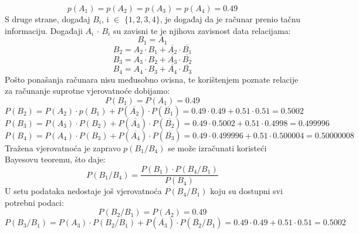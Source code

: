 \documentclass[12pt]{article}
\begin{document}
\begin{enumerate}
\begin{equation*}
    p(A_1) = p(A_2) = p(A_3) = p(A_4) = 0.49
\end{equation*}
S druge strane, događaj $B_i$, i ${\in}$ $\{1, 2, 3, 4\}$, je događaj da je računar prenio tačnu informaciju. 
Događaji $A_i$ ${\cdot}$ $B_i$ su zavisni te je njihova zavisnost data relacijama:
\begin{equation*}
    B_1 = A_1
\end{equation*}
\begin{equation*}
    B_2 = A_2 \cdot B_1 + \overline{A_2} \cdot \overline{B_1}
\end{equation*}
\begin{equation*}
    B_3 = A_3 \cdot B_2 + \overline{A_3} \cdot \overline{B_2}
\end{equation*}
\begin{equation*}
    B_4 = A_4 \cdot B_3 + \overline{A_4} \cdot \overline{B_3}
\end{equation*}
Pošto ponašanja računara nisu međusobno ovisna, te korištenjem poznate relacije za računanje
suprotne vjerovatnoće dobijamo:
\begin{equation*}
    P(B_1) = P(A_1) = 0.49
\end{equation*}
\begin{equation*}
    P(B_2) = P(A_2) \cdot p(B_1) + P(\overline{A_2}) \cdot P(\overline{B_1}) = 0.49 \cdot 0.49 + 0.51 \cdot 0.51 = 0.5002 
\end{equation*}
\begin{equation*}
    P(B_3) = P(A_3) \cdot P(B_2) + P(\overline{A_3}) \cdot P(\overline{B_2}) = 0.49 \cdot 0.5002 + 0.51 \cdot 0.4998 = 0.499996
\end{equation*}
\begin{equation*}
    P(B_4) = P(A_4) \cdot P(B_3) + P(\overline{A_4}) \cdot P(\overline{B_3}) = 0.49 \cdot 0.499996 + 0.51 \cdot 0.500004 = 0.50000008
\end{equation*}
\newpage
Tražena vjerovatnoća je zapravo $p(B_1/B_4)$ se može izračunati koristeći Bayesovu teoremu, što
daje:
\begin{equation*}
    P(B_1/B_4) = \frac{P(B_1) \cdot P(B_4/B_1)}{P(B_4)}
\end{equation*}
U setu podataka nedostaje još vjerovatnoća $P(B_4/B_1)$ koju su dostupni svi potrebni podaci:
\begin{equation*}
    P(B_2/B_1) = P(A_2) = 0.49
\end{equation*}
\begin{equation*}
    P(B_3/B_1) = P(A_3) \cdot P(B_2/B_1) + P(\overline{A_3}) \cdot P(\overline{B_2}/B_1) = 0.49 \cdot 0.49 + 0.51 \cdot 0.51 = 0.5002 

\end{equation*}
\end{enumerate}
\end{document}
